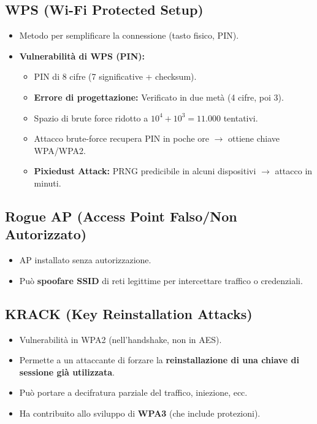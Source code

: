 \documentclass{article}
\begin{document}
\subsection{WPS (Wi-Fi Protected Setup)}
\begin{itemize}
    \item Metodo per semplificare la connessione (tasto fisico, PIN).
    \item \textbf{Vulnerabilità di WPS (PIN):}
    \begin{itemize}
        \item PIN di 8 cifre (7 significative + checksum).
        \item \textbf{Errore di progettazione:} Verificato in due metà (4 cifre, poi 3).
        \item Spazio di brute force ridotto a $10^4 + 10^3 = 11.000$ tentativi.
        \item Attacco brute-force recupera PIN in poche ore $\rightarrow$ ottiene chiave WPA/WPA2.
        \item \textbf{Pixiedust Attack:} PRNG predicibile in alcuni dispositivi $\rightarrow$ attacco in minuti.
    \end{itemize}
\end{itemize}

\subsection{Rogue AP (Access Point Falso/Non Autorizzato)}
\begin{itemize}
    \item AP installato senza autorizzazione.
    \item Può \textbf{spoofare SSID} di reti legittime per intercettare traffico o credenziali.
\end{itemize}

\subsection{KRACK (Key Reinstallation Attacks)}
\begin{itemize}
    \item Vulnerabilità in WPA2 (nell'handshake, non in AES).
    \item Permette a un attaccante di forzare la \textbf{reinstallazione di una chiave di sessione già utilizzata}.
    \item Può portare a decifratura parziale del traffico, iniezione, ecc.
    \item Ha contribuito allo sviluppo di \textbf{WPA3} (che include protezioni).
\end{itemize}
\end{document}
